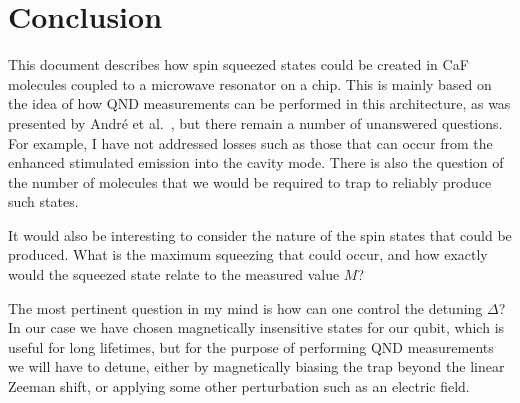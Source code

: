 \documentclass{article}
\begin{document}
\section{Conclusion}

This document describes how spin squeezed states could be created in CaF
molecules coupled to a microwave resonator on a chip. This is mainly based on
the idea of how QND measurements can be performed in this architecture, as was
presented by Andr\'e et al.~\cite{Andre2006}, but there remain a number of
unanswered questions. For example, I have not addressed losses such as those
that can occur from the enhanced stimulated emission into the cavity mode.
There is also the question of the number of molecules that we would be required
to trap to reliably produce such states.

It would also be interesting to consider the nature of the spin states that
could be produced. What is the maximum squeezing that could occur, and how
exactly would the squeezed state relate to the measured value $M$?

The most pertinent question in my mind is how can one control the detuning
$\Delta$? In our case we have chosen magnetically insensitive states for our
qubit, which is useful for long lifetimes, but for the purpose of performing
QND measurements we will have to detune, either by magnetically biasing the
trap beyond the linear Zeeman shift, or applying some other perturbation
such as an electric field.

%
%

\printbibliography
\end{document}
